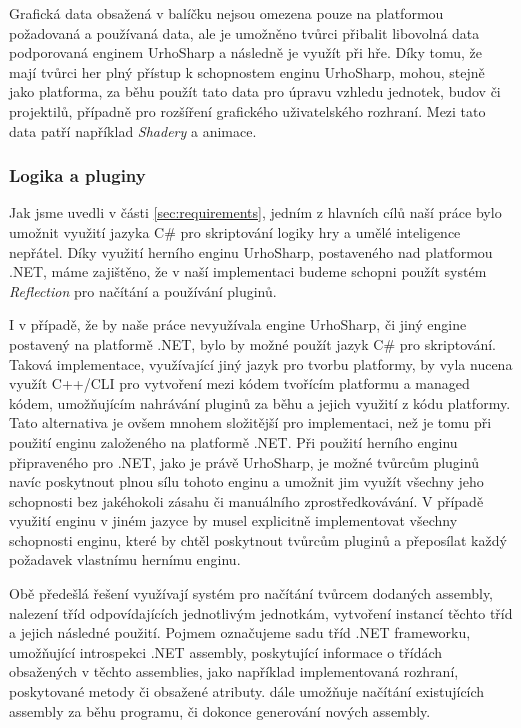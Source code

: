 Grafická data obsažená v balíčku nejsou omezena pouze na platformou požadovaná a používaná data, ale je umožněno tvůrci přibalit libovolná data podporovaná enginem UrhoSharp a následně je využít při hře. Díky tomu, že mají tvůrci her plný přístup k schopnostem enginu UrhoSharp, mohou, stejně jako platforma, za běhu použít tato data pro úpravu vzhledu jednotek, budov či projektilů, případně pro rozšíření grafického uživatelského rozhraní. Mezi tato data patří například \textit{Shadery} a animace.

\subsubsection{Logika a pluginy}
Jak jsme uvedli v části \ref{sec:requirements}, jedním z hlavních cílů naší práce bylo umožnit využití jazyka C\# pro skriptování logiky hry a umělé inteligence nepřátel. Díky využití herního enginu UrhoSharp, postaveného nad platformou .NET, máme zajištěno, že v naší implementaci budeme schopni použít systém \textit{Reflection} pro načítání a používání pluginů. 

I v případě, že by naše práce nevyužívala engine UrhoSharp, či jiný engine postavený na platformě .NET, bylo by možné použít jazyk C\# pro skriptování. Taková implementace, využívající jiný jazyk pro tvorbu platformy, by vyla nucena využít C++/CLI pro vytvoření   mezi kódem tvořícím platformu a managed kódem, umožňujícím nahrávání pluginů za běhu a jejich využití z kódu platformy. Tato alternativa je ovšem mnohem složitější pro implementaci, než je tomu při použití enginu založeného na platformě .NET. Při použití herního enginu připraveného pro .NET, jako je právě UrhoSharp, je možné tvůrcům pluginů navíc poskytnout plnou sílu tohoto enginu a umožnit jim využít všechny jeho schopnosti bez jakéhokoli zásahu či manuálního zprostředkovávání. V případě využití enginu v jiném jazyce by musel   explicitně implementovat všechny schopnosti enginu, které by chtěl poskytnout tvůrcům pluginů a přeposílat každý požadavek vlastnímu hernímu enginu.

Obě předešlá řešení využívají systém   pro načítání tvůrcem dodaných assembly, nalezení tříd odpovídajících jednotlivým jednotkám, vytvoření instancí těchto tříd a jejich následné použití. Pojmem   označujeme sadu tříd .NET frameworku, umožňující introspekci .NET assembly, poskytující informace o třídách obsažených v těchto assemblies, jako například implementovaná rozhraní, poskytované metody či obsažené atributy.   dále umožňuje načítání existujících assembly za běhu programu, či dokonce generování nových assembly. 


